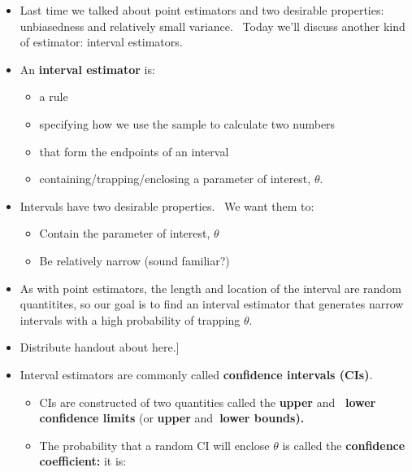 \documentclass[11pt]{article}
\begin{document}
\begin{itemize}
\item Last time we talked about point estimators and two desirable
properties: unbiasedness and relatively small variance. \ Today we'll
discuss another kind of estimator: interval estimators.

\item An \textbf{interval estimator }is:

\begin{itemize}
\item a rule

\item specifying how we use the sample to calculate two numbers

\item that form the endpoints of an interval

\item containing/trapping/enclosing a parameter of interest, $\theta $.
\end{itemize}

\item Intervals have two desirable properties. \ We want them to:

\begin{itemize}
\item Contain the parameter of interest, $\theta $

\item Be relatively narrow (sound familiar?)
\end{itemize}

\item As with point estimators, the length and location of the interval are
random quantitites, so our goal is to find an interval estimator that
generates narrow intervals with a high probability of trapping $\theta .$

\item \lbrack Distribute handout about here.]

\item Interval estimators are commonly called \textbf{confidence intervals
(CIs)}. \ 

\begin{itemize}
\item CIs are constructed of two quantities called the \textbf{upper }and%
\textbf{\ lower confidence limits} (or \textbf{upper }and\textbf{\ lower
bounds).}

\item The probability that a random CI will enclose $\theta $ is called the 
\textbf{confidence coefficient: }it is:


\end{itemize}
\end{itemize}
\end{document}
